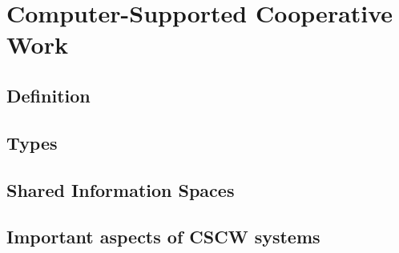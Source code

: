 
\section{Computer-Supported Cooperative Work}
\label{sec:cscw}

\subsection{Definition}
\label{sec:cscw_definition}


\subsection{Types}
\label{sec:cscw_types}


\subsection{Shared Information Spaces}
\label{sec:cscw_shared_spaces}


\subsection{Important aspects of CSCW systems}
\label{sec:cscw_req_aspects}



